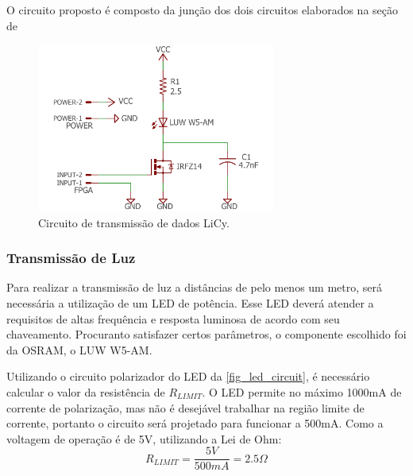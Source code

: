 		O circuito proposto é composto da junção dos dois circuitos elaborados na seção de 
		\begin{figure}[htb]
			\caption{\label{fig_transmitter_lify_circuit} Circuito de transmissão de dados LiCy.}
			\centering		%
			\includegraphics[width=0.7\textwidth, trim={2cm 0cm 2cm 0cm}, clip]{circuits/transmitter_lify.pdf}
		\end{figure}

	\subsubsection{Transmissão de Luz}
		
		Para realizar a transmissão de luz a distâncias de pelo menos um metro, será necessária a utilização de um LED de potência. Esse LED deverá atender a requisitos de altas frequência e resposta luminosa de acordo com seu chaveamento. Procuranto satisfazer certos parâmetros, o componente escolhido foi da OSRAM, o LUW W5-AM.
		

		Utilizando o circuito polarizador do LED da \autoref{fig_led_circuit}, é necessário calcular o valor da resistência de $R_{LIMIT}$. O LED permite no máximo 1000mA de corrente de polarização, mas não é desejável trabalhar na região limite de corrente, portanto o circuito será projetado para funcionar a 500mA. Como a voltagem de operação é de 5V, utilizando a Lei de Ohm:
		\begin{equation}
		R_{LIMIT} = \frac{5V}{500mA} = 2.5\Omega
		\end{equation}
		
